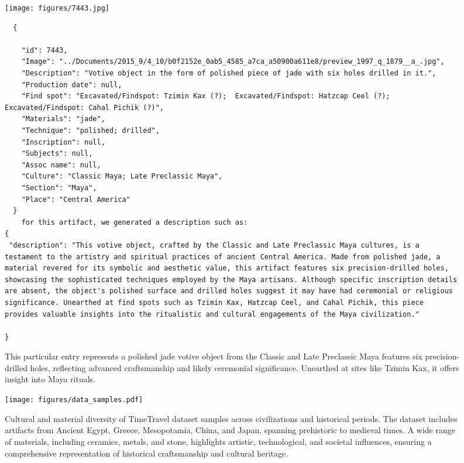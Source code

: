 \documentclass[11pt]{article}
\begin{document}
\begin{figure}[!t]
\begin{tcolorbox}[colback=brown!5, colframe=brown!35,
    fonttitle=\bfseries,
    ]
\small

\lstset{breaklines=true, basicstyle=\scriptsize\ttfamily} 
\begin{center}\texttt{[image: figures/7443.jpg]}\end{center}
\begin{lstlisting}
  {
  
    "id": 7443,
    "Image": "../Documents/2015_9/4_10/b0f2152e_0ab5_4585_a7ca_a50900a611e8/preview_1997_q_1879__a_.jpg",
    "Description": "Votive object in the form of polished piece of jade with six holes drilled in it.",
    "Production date": null,
    "Find spot": "Excavated/Findspot: Tzimin Kax (?);  Excavated/Findspot: Hatzcap Ceel (?);  Excavated/Findspot: Cahal Pichik (?)",
    "Materials": "jade",
    "Technique": "polished; drilled",
    "Inscription": null,
    "Subjects": null,
    "Assoc name": null,
    "Culture": "Classic Maya; Late Preclassic Maya",
    "Section": "Maya",
    "Place": "Central America"
  }
    for this artifact, we generated a description such as:
{
 "description": "This votive object, crafted by the Classic and Late Preclassic Maya cultures, is a testament to the artistry and spiritual practices of ancient Central America. Made from polished jade, a material revered for its symbolic and aesthetic value, this artifact features six precision-drilled holes, showcasing the sophisticated techniques employed by the Maya artisans. Although specific inscription details are absent, the object's polished surface and drilled holes suggest it may have had ceremonial or religious significance. Unearthed at find spots such as Tzimin Kax, Hatzcap Ceel, and Cahal Pichik, this piece provides valuable insights into the ritualistic and cultural engagements of the Maya civilization."
 
}
\end{lstlisting}
\end{tcolorbox}
\caption{
\small
This particular entry represents a polished jade votive object from the Classic and Late Preclassic Maya features six precision-drilled holes, reflecting advanced craftsmanship and likely ceremonial significance. Unearthed at sites like Tzimin Kax, it offers insight into Maya rituals.}
\label{fig:raw-data-maya}
\end{figure}

\begin{figure*}[t!]
    \centering
    \texttt{[image: figures/data\_samples.pdf]}
    \caption{Cultural and material diversity of TimeTravel dataset samples across civilizations and historical periods. The dataset includes artifacts from Ancient Egypt, Greece, Mesopotamia, China, and Japan, spanning prehistoric to medieval times. A wide range of materials, including ceramics, metals, and stone, highlights artistic, technological, and societal influences, ensuring a comprehensive representation of historical craftsmanship and cultural heritage.}
    \label{fig:appendix_qual_examples}
\end{figure*}
\end{document}
